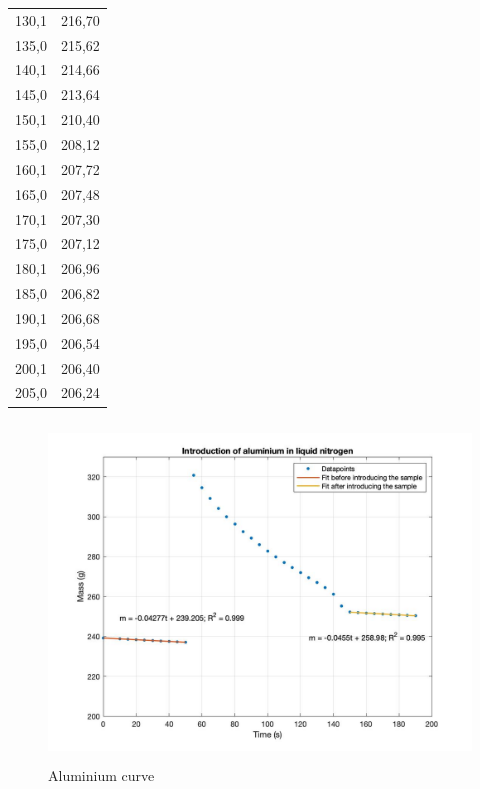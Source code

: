 \documentclass[a4paper, 12pt]{article}
\begin{document}
\begin{table}[H]
\begin{tabular}{|c | c|}
		130,1             & 216,70            \\
		135,0             & 215,62            \\
		140,1             & 214,66            \\
		145,0             & 213,64            \\
		150,1             & 210,40            \\
		155,0             & 208,12            \\
		\rowcolor[HTML]{FFFF00} 
		160,1             & 207,72            \\
		165,0             & 207,48            \\
		170,1             & 207,30            \\
		175,0             & 207,12            \\
		180,1             & 206,96            \\
		185,0             & 206,82            \\
		190,1             & 206,68            \\
		195,0             & 206,54            \\
		200,1             & 206,40            \\
		205,0             & 206,24  \\
			\hline
		\end{tabular}

	\end{table}

	\begin{figure}[hbt!]
		\centering
		\caption{Aluminium curve}
		\includegraphics[height=9cm]{aluminiumcurve}
	\end{figure}
\end{document}
